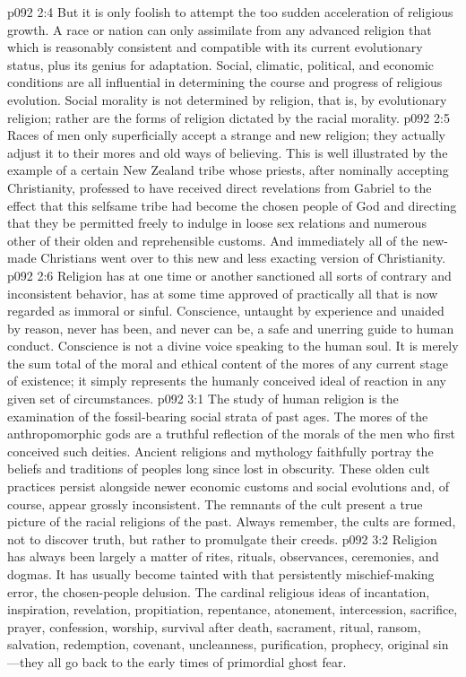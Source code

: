 \vs p092 2:4 But it is only foolish to attempt the too sudden acceleration of religious growth. A race or nation can only assimilate from any advanced religion that which is reasonably consistent and compatible with its current evolutionary status, plus its genius for adaptation. Social, climatic, political, and economic conditions are all influential in determining the course and progress of religious evolution. Social morality is not determined by religion, that is, by evolutionary religion; rather are the forms of religion dictated by the racial morality.
\vs p092 2:5 Races of men only superficially accept a strange and new religion; they actually adjust it to their mores and old ways of believing. This is well illustrated by the example of a certain New Zealand tribe whose priests, after nominally accepting Christianity, professed to have received direct revelations from Gabriel to the effect that this selfsame tribe had become the chosen people of God and directing that they be permitted freely to indulge in loose sex relations and numerous other of their olden and reprehensible customs. And immediately all of the new\hyp{}made Christians went over to this new and less exacting version of Christianity.
\vs p092 2:6 Religion has at one time or another sanctioned all sorts of contrary and inconsistent behavior, has at some time approved of practically all that is now regarded as immoral or sinful. Conscience, untaught by experience and unaided by reason, never has been, and never can be, a safe and unerring guide to human conduct. Conscience is not a divine voice speaking to the human soul. It is merely the sum total of the moral and ethical content of the mores of any current stage of existence; it simply represents the humanly conceived ideal of reaction in any given set of circumstances.\plusone
{}
\vs p092 3:1 The study of human religion is the examination of the fossil\hyp{}bearing social strata of past ages. The mores of the anthropomorphic gods are a truthful reflection of the morals of the men who first conceived such deities. Ancient religions and mythology faithfully portray the beliefs and traditions of peoples long since lost in obscurity. These olden cult practices persist alongside newer economic customs and social evolutions and, of course, appear grossly inconsistent. The remnants of the cult present a true picture of the racial religions of the past. Always remember, the cults are formed, not to discover truth, but rather to promulgate their creeds.\plusone
\vs p092 3:2 Religion has always been largely a matter of rites, rituals, observances, ceremonies, and dogmas. It has usually become tainted with that persistently mischief\hyp{}making error, the chosen\hyp{}people delusion. The cardinal religious ideas of incantation, inspiration, revelation, propitiation, repentance, atonement, intercession, sacrifice, prayer, confession, worship, survival after death, sacrament, ritual, ransom, salvation, redemption, covenant, uncleanness, purification, prophecy, original sin---they all go back to the early times of primordial ghost fear.
